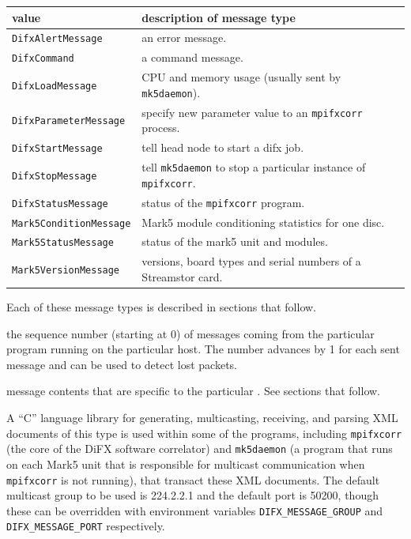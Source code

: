\begin{description}
\begin{tabular}{ll}
value    & description of message type \\
\hline
{\tt DifxAlertMessage} & an error message. \\
{\tt DifxCommand} & a command message. \\
{\tt DifxLoadMessage} & CPU and memory usage (usually sent by {\tt mk5daemon}). \\
{\tt DifxParameterMessage} & specify new parameter value to an {\tt mpifxcorr} process. \\
{\tt DifxStartMessage} & tell head node to start a difx job. \\
{\tt DifxStopMessage} & tell {\tt mk5daemon} to stop a particular instance of {\tt mpifxcorr}. \\
{\tt DifxStatusMessage} & status of the {\tt mpifxcorr} program. \\
{\tt Mark5ConditionMessage} & Mark5 module conditioning statistics for one disc. \\
{\tt Mark5StatusMessage} & status of the mark5 unit and modules. \\
{\tt Mark5VersionMessage} & versions, board types and serial numbers of a Streamstor card. 
\end{tabular}

\noindent Each of these message types is described in sections that follow.

\item[\bfit{seqNum}] the sequence number (starting at 0) of messages coming from the particular program running on the particular host.
The number advances by 1 for each sent message and can be used to detect lost packets.
\item[\bfit{body}] message contents that are specific to the particular .
See sections that follow.
\end{description}

A ``C'' language library for generating, multicasting, receiving, and parsing XML documents of this type is used within some of the programs, including {\tt mpifxcorr} (the core of the DiFX \cite{difx} software correlator) and {\tt mk5daemon} (a program that runs on each Mark5 unit that is responsible for multicast communication when {\tt mpifxcorr} is not running), that transact these XML documents.
The default multicast group to be used is 224.2.2.1 and the default port is 50200, though these can be overridden with environment variables {\tt DIFX\_MESSAGE\_GROUP} and {\tt DIFX\_MESSAGE\_PORT} respectively.






